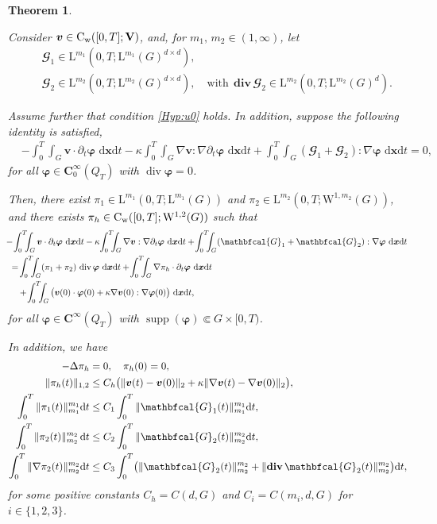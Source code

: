 \documentclass[12pt,reqno]{amsart}
\numberwithin{equation}{section}
\newtheorem{theorem}{Theorem}[section]
\let\originalleft\left
\let\originalright\right
\renewcommand{\left}{\mathopen{}\mathclose\bgroup\originalleft}
\renewcommand{\right}{\aftergroup\egroup\originalright}
\theoremstyle{definition}
\def\d{\mathrm{d}}
\def\dt{\,\mathrm{d}t}
\def\dxt{\,\mathrm{d}\boldsymbol{x}\mathrm{d}t}
\def\div{\operatorname{div}}
\def\divv{\mathbf{div}\,}
\def\supp{\operatorname{supp}}
\def\W{\mathrm{W}}
\def\L{\mathrm{L}}
\def\vv{\boldsymbol{v}}
\def\C{\mathrm{C}}
\def\bfC{\mathbf{C}}
\def\bfV{\mathbf{V}}
\def\rw{\rm{w}}
\def\bfi{\boldsymbol{\varphi}}
\def\bcG{\mathbfcal{G}}
\begin{document}
\begin{theorem}\label{thrm41}
{Consider $\vv \in \C_{\rw}([0,T]; \bfV)$, and, for $m_1,\, m_2\in(1,\infty)$, let
\begin{eqnarray*}
  && \bcG_1 \in \L^{m_1}(0,T;\L^{m_1}(G)^{d\times d}), \\
  && \bcG_2 \in \L^{m_2}(0,T;\L^{m_2}(G)^{d\times d}),\quad \mbox{with}\ \ \divv\bcG_2 \in \L^{m_2}(0,T;\L^{m_2}(G)^{d}).
\end{eqnarray*}

Assume further that condition \eqref{Hyp:u0} holds.
In addition, suppose the following identity is satisfied,
\begin{equation}\label{PD1}
\begin{split}
   & -\!\int_0^T \!\!\!\int_G \vv \cdot \partial_t \bfi \, \dxt
  - \kappa \!\int_0^T \!\!\!\int_G \nabla \vv : \nabla \partial_t \bfi \, \dxt +
   \!\int_0^T \!\!\!\int_G (\bcG_1 + \bcG_2) : \nabla \bfi \, \dxt=0,
\end{split}
\end{equation}
for all $\bfi \in \bfC^\infty_{0}(Q_T)$ with $\div\bfi=0$.

Then, there exist $\pi_1 \in \L^{m_1}(0,T; \L^{m_1}(G))$ and $\pi_2 \in \L^{m_2}(0,T; \W^{1,m_2}(G))$,  and there exists $\pi_h \in \C_{\rw}([0,T]; \W^{1,2}(G))$ such that
\begin{equation}\label{decomp:press}
\begin{split}
&\hspace{-2mm} -\!\int_0^T \!\!\!\int_G \vv \cdot \partial_t \bfi \, \dxt
  - \kappa \!\int_0^T \!\!\!\int_G \nabla \vv : \nabla \partial_t \bfi \, \dxt + \!\int_0^T \!\!\!\int_G (\bcG_1 + \bcG_2) : \nabla \bfi \, \dxt
  \\
  & =
  \!\int_0^T \!\!\!\int_G (\pi_1 + \pi_2) \, \div\bfi \, \dxt + \!\int_0^T \!\!\!\int_G \nabla \pi_h \cdot \partial_t \bfi \, \dxt \\
&\quad
  + \!\int_0^T \!\!\!\int_G \big( \vv(0) \cdot \bfi(0)
  + \kappa \nabla \vv(0) : \nabla \bfi(0) \big) \, \dxt,
\end{split}
\end{equation}
for all $\bfi \in \bfC^\infty(Q_T)$ with $\supp(\bfi)\Subset G \times[0,T)$.

In addition, we have
\begin{align}\label{press:3:1}
-\Delta \pi_h&=0,\quad \pi_h(0)=0, \\
 \|\pi_h(t)\|_{1,2} &\leq C_h\big(\|\vv(t)-\vv(0)\|_2+\kappa\|\nabla\vv(t)-\nabla\vv(0)\|_2\big), \label{press:3:2} \\
 \int_{0}^{T}\|\pi_1(t)\|_{m_1}^{m_1}\d t &\leq C_1\int_{0}^{T}\|\bcG_1(t)\|_{m_1}^{m_1}\d t, \label{press:3:3:1} \\
 \int_{0}^{T}\|\pi_2(t)\|_{m_2}^{m_2}\dt &\leq C_2\int_{0}^{T}\|\bcG_2(t)\|_{m_2}^{m_2}\d t, \label{press:3:3:2} \\
  \int_{0}^{T}\|\nabla\pi_2(t)\|_{m_2}^{m_2}\d t &\leq C_3\int_{0}^{T}\left(\|\bcG_2(t)\|_{m_2}^{m_2}+\|\divv\bcG_2(t)\|_{m_2}^{m_2}\right)\d t, \label{press:3:4}
\end{align}
for some positive constants $C_h=C(d,G)$ and $C_i=C(m_i,d,G)$ for $i\in\{1,2,3\}$.

}
\end{theorem}
\end{document}
